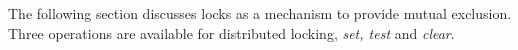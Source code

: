 The following section discusses \openshmem locks as a mechanism to provide mutual exclusion. Three operations are available for distributed locking, 
\textit{set, test} and \textit{clear}.